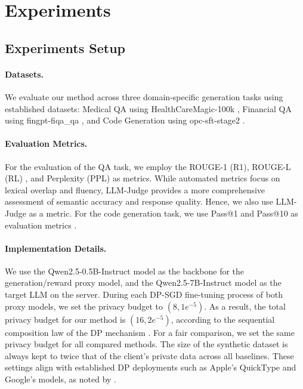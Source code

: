 \section{Experiments}
\subsection{Experiments Setup}
\label{sec:setup}

\paragraph{Datasets.}
We evaluate our method across three domain-specific generation tasks using established datasets: Medical QA using HealthCareMagic-100k \citep{li2023chatdoctor}, Financial QA using fingpt-fiqa\_qa \citep{zhang2023instructfingpt}, and Code Generation using opc-sft-stage2 \citep{Huang2024OpenCoderTO}. 

\paragraph{Evaluation Metrics.} 
For the evaluation of the QA task, we employ the ROUGE-1 (R1), ROUGE-L (RL) \citep{lin-2004-rouge}, and Perplexity (PPL) \citep{yu2024ppl} as metrics. 
While automated metrics focus on lexical overlap and fluency, LLM-Judge \citep{Lia2023judging} provides a more comprehensive assessment of semantic accuracy and response quality. 
Hence, we also use LLM-Judge as a metric. 
For the code generation task, we use Pass@1 and Pass@10 as evaluation metrics \citep{chen2021codex}. 


\paragraph{Implementation Details.}
We use the Qwen2.5-0.5B-Instruct model \citep{yang2024qwen2} as the backbone for the generation/reward proxy model, and the Qwen2.5-7B-Instruct model as the target LLM on the server. 
During each DP-SGD fine-tuning process of both proxy models, we set the privacy budget to $(8, 1e^{-5})$. 
As a result, the total privacy budget for our method is $(16, 2e^{-5})$, according to the sequential composition law of the DP mechanism \citep{Abadi2016DeepLDP}.
For a fair comparison, we set the same privacy budget for all compared methods. 
The size of the synthetic dataset is always kept to twice that of the client's private data across all baselines. 
These settings align with established DP deployments such as Apple's QuickType and Google's models, as noted by \citet{Nils2023ana}.

